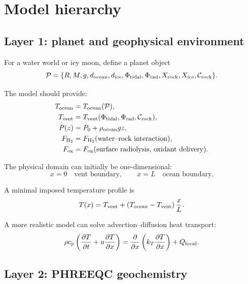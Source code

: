 \documentclass[11pt]{article}
\begin{document}
\section{Model hierarchy}

\subsection{Layer 1: planet and geophysical environment}

For a water world or icy moon, define a planet object
\begin{equation}
\mathcal{P}
=
\{
R, M, g, d_{\rm ocean}, d_{\rm ice}, \Phi_{\rm tidal},
\Phi_{\rm rad}, X_{\rm rock}, X_{\rm ice}, \mathcal{C}_{\rm rock}
\}.
\end{equation}

The model should provide:
\begin{align}
T_{\rm ocean} &= T_{\rm ocean}(\mathcal{P}),\\
T_{\rm vent} &= T_{\rm vent}(\Phi_{\rm tidal},\Phi_{\rm rad},\mathcal{C}_{\rm rock}),\\
P(z) &= P_0 + \rho_{\rm ocean} g z,\\
F_{\rm H_2} &= F_{\rm H_2}(\text{water--rock interaction}),\\
F_{\rm ox} &= F_{\rm ox}(\text{surface radiolysis, oxidant delivery}).
\end{align}

The physical domain can initially be one-dimensional:
\begin{equation}
x=0 \quad \text{vent boundary}, \qquad
x=L \quad \text{ocean boundary}.
\end{equation}

A minimal imposed temperature profile is
\begin{equation}
T(x)=T_{\rm vent}
+
\left(T_{\rm ocean}-T_{\rm vent}\right)
\frac{x}{L}.
\end{equation}

A more realistic model can solve advection--diffusion heat transport:
\begin{equation}
\rho c_p
\left(
\frac{\partial T}{\partial t}
+
u\frac{\partial T}{\partial x}
\right)
=
\frac{\partial}{\partial x}
\left(k_T \frac{\partial T}{\partial x}\right)
+
Q_{\rm local}.
\end{equation}

\subsection{Layer 2: PHREEQC geochemistry}
\end{document}
